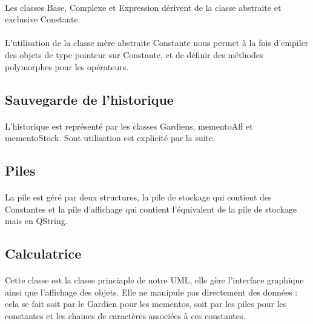 \documentclass[a4paper,11pt]{report}
\begin{document}
			\paragraph{}Les classes Base, Complexe et Expression dérivent de la classe abstraite et exclusive Constante. 

			\paragraph{}L'utilisation de la classe mère abstraite Constante nous permet à la fois d'empiler des objets de type pointeur sur Constante, et de définir des méthodes polymorphes pour les opérateurs. 

		\subsection{Sauvegarde de l'historique}
	 		\paragraph{}L'historique est représenté par les classes Gardiens, mementoAff et mementoStock. Sont utilisation est explicité par la suite.
		\subsection{Piles}
			\paragraph{} La pile est géré par deux structures, la pile de stockage qui contient des Constantes et la pile d'affichage qui contient l'équivalent de la pile de stockage mais en QString.
		
		\subsection{Calculatrice}
			\paragraph{}Cette classe est la classe princiaple de notre UML, elle gère l'interface graphique ainsi que l'affichage des objets. Elle ne manipule pas directement des données : cela se fait soit par le Gardien pour les mementos, soit par les piles pour les constantes et les chaines de caractères associées à ces constantes.
			
\end{document}

